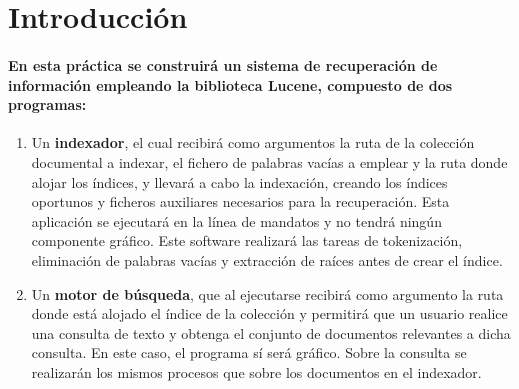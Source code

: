 \chapter{Introducción}

\subsubsection{En esta práctica se construirá un sistema de recuperación
de información empleando la biblioteca Lucene, compuesto de dos
programas:}

\begin{enumerate}
\item{
  Un \textbf{indexador}, el cual recibirá como argumentos la ruta de la
  colección documental a indexar, el fichero de palabras vacías a
  emplear y la ruta donde alojar los índices, y llevará a cabo la
  indexación, creando los índices oportunos y ficheros auxiliares
  necesarios para la recuperación. Esta aplicación se ejecutará en la
  línea de mandatos y no tendrá ningún componente gráfico. Este software
  realizará las tareas de tokenización, eliminación de palabras vacías y
  extracción de raíces antes de crear el índice.}
\item
  Un \textbf{motor de búsqueda}, que al ejecutarse recibirá como
  argumento la ruta donde está alojado el índice de la colección y
  permitirá que un usuario realice una consulta de texto y obtenga el
  conjunto de documentos relevantes a dicha consulta. En este caso, el
  programa sí será gráfico. Sobre la consulta se realizarán los mismos
  procesos que sobre los documentos en el indexador.
\end{enumerate}